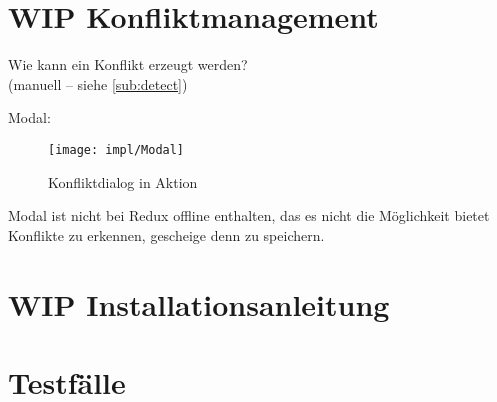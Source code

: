 \section{WIP Konfliktmanagement}
Wie kann ein Konflikt erzeugt werden?\\
(manuell -- siehe \ref{sub:detect})
\begin{center}
  
\end{center}

\begin{center}
  
\end{center}

\begin{center}
  
\end{center}

Modal:
\begin{figure}[H]
  \centering
  \texttt{[image: impl/Modal]}
  \grayRule
  \caption{Konfliktdialog in Aktion}
  \label{fig:modal}
\end{figure}
Modal ist nicht bei Redux offline enthalten, das es nicht die Möglichkeit bietet Konflikte zu erkennen, gescheige denn zu speichern.
%
%
%
%
%
\section{WIP Installationsanleitung}


%
%
\section{\label{chap:impl:test}Testfälle}
